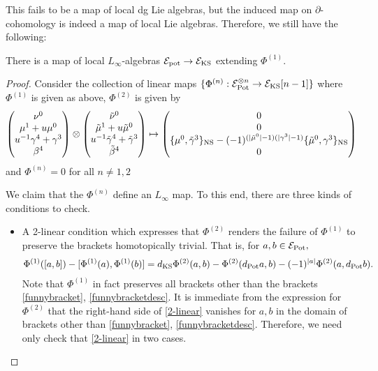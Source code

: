 \documentclass[11pt]{amsart}
\begin{document}
This fails to be a map of local dg Lie algebras, but the induced map on $\partial$-cohomology is indeed a map of local Lie algebras. Therefore, we still have the following:

\begin{prop}
There is a map of local $L_{\infty}$-algebras $\mathcal E_{\rm pot}\to \mathcal E_{\rm KS}$ extending $\Phi^{(1)}$.
\end{prop}
\begin{proof}
  Consider the collection of linear maps $\{\Phi^{(n)}: \mathcal E_{\rm Pot}^{\otimes n}\to \mathcal E_{\rm KS}[n-1]\}$ where $\Phi^{(1)}$ is given as above, $\Phi^{{(2)}}$ is given by \[\begin{pmatrix}\nu^{0} \\ \mu^{1}+u\mu^{0} \\ u^{-1}\gamma^{4}+\gamma^{3} \\ \beta^{4}\end{pmatrix}\otimes \begin{pmatrix}\tilde{\nu}^{0} \\ \tilde{\mu}^{1}+u\tilde{\mu}^{0}\\ u^{-1}\tilde{\gamma}^{4}+\tilde{\gamma}^{3} \\ \tilde{\beta}^{4} \end{pmatrix}\mapsto \begin{pmatrix} 0 \\ 0 \\ \{\mu^{0},\tilde{\gamma}^{3}\}_{\rm NS}-(-1)^{(|\tilde \mu^{0}|-1)(|\gamma^{3}|-1)}\{\tilde{\mu}^{0},\gamma^{3}\}_{\rm NS} \\ 0\end{pmatrix}\] and $\Phi^{(n)}=0$ for all $n\neq 1,2$

  We claim that the $\Phi^{(n)}$ define an $L_{\infty}$ map. To this end, there are three kinds of conditions to check.
  \begin{itemize}
    \item A 2-linear condition which expresses that $\Phi^{(2)}$ renders the failure of $\Phi^{(1)}$ to preserve the brackets homotopically trivial. That is, for $a,b\in\mathcal E_{\rm Pot},$ \begin{align*}\Phi^{(1)}([a,b])-[\Phi^{(1)}(a),\Phi^{(1)}(b)]=d_{\rm KS}\Phi^{(2)}(a,b)-\Phi^{(2)}(d_{\rm Pot}a, b)-(-1)^{|a|}\Phi^{(2)}(a,d_{\rm Pot}b)\label{2-linear}.\end{align*} Note that $\Phi^{(1)}$ in fact preserves all brackets other than the brackets \ref{funnybracket}, \ref{funnybracketdesc}. It is immediate from the expression for $\Phi^{(2)}$ that the right-hand side of \ref{2-linear} vanishes for $a, b$ in the domain of brackets other than \ref{funnybracket}, \ref{funnybracketdesc}. Therefore, we need only check that \ref{2-linear} in two cases.


\end{itemize}
\end{proof}
\end{document}

